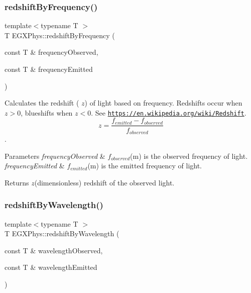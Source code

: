 \subsubsection{\texorpdfstring{redshift\+By\+Frequency()}{redshiftByFrequency()}}
{\footnotesize\ttfamily template$<$typename T $>$ \\
T E\+G\+X\+Phys\+::redshift\+By\+Frequency (\begin{DoxyParamCaption}\item[{const T \&}]{frequency\+Observed,  }\item[{const T \&}]{frequency\+Emitted }\end{DoxyParamCaption})}



Calculates the redshift ( $z$) of light based on frequency. Redshifts occur when $z > 0$, blueshifts when $z < 0$. See \href{https://en.wikipedia.org/wiki/Redshift}{\tt https\+://en.\+wikipedia.\+org/wiki/\+Redshift}. \[z=\frac{f_{emitted}-f_{observed}}{f_{observed}}\]. 


\begin{DoxyParams}{Parameters}
{\em frequency\+Observed} & $f_{observed}$(m) is the observed frequency of light. \\
\hline
{\em frequency\+Emitted} & $f_{emitted}$(m) is the emitted frequency of light. \\
\hline
\end{DoxyParams}
\begin{DoxyReturn}{Returns}
$z$(dimensionless) redshift of the observed light. 
\end{DoxyReturn}
\mbox{\label{group___optics_ga29300a13e34da35332ca2d447b5ce82d}} 
\subsubsection{\texorpdfstring{redshift\+By\+Wavelength()}{redshiftByWavelength()}}
{\footnotesize\ttfamily template$<$typename T $>$ \\
T E\+G\+X\+Phys\+::redshift\+By\+Wavelength (\begin{DoxyParamCaption}\item[{const T \&}]{wavelength\+Observed,  }\item[{const T \&}]{wavelength\+Emitted }\end{DoxyParamCaption})}



